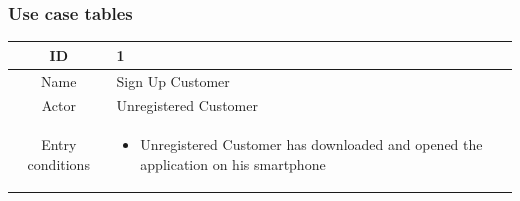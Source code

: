 \subsubsection{Use case tables}
\begin{longtable}{ | c | p{10cm} | }

    \hline
    ID               & 1                        \\ \hline
    Name             & Sign Up Customer   \\
    \hline
    Actor            & Unregistered Customer \\
    \hline
    Entry conditions &
    \begin{itemize}
        \item Unregistered Customer has downloaded and opened the application on his smartphone
    \end{itemize}
    \\
    \hline


\end{longtable}
